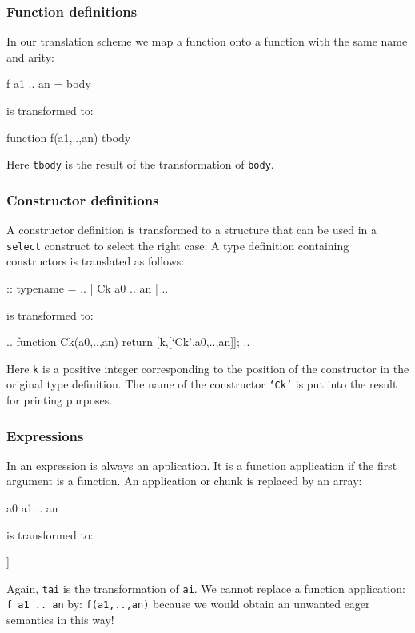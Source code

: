 \subsubsection{Function definitions} 
In our translation scheme we map a \Sapl function onto a \JS function with the same name and arity:
\begin{CleanCode}
f a1 .. an = body
\end{CleanCode}
is transformed to:
\begin{CleanCode}
function f(a1,..,an) { tbody }
\end{CleanCode}
Here \texttt{tbody} is the result of the transformation of \texttt{body}.

\subsubsection{Constructor definitions} 
A constructor definition is transformed to a structure that can be used in a \texttt{select} construct to 
select the right case. A \Sapl type definition containing constructors is translated as follows:
\begin{CleanCode}
:: typename = .. | Ck a0 .. an | ..
\end{CleanCode}
is transformed to:
\begin{CleanCode}
.. function Ck(a0,..,an) {return [k,[`Ck',a0,..,an]];} ..
\end{CleanCode}
Here \texttt{k} is a positive integer corresponding to the position of the constructor in
the original type definition. The name of the constructor \texttt{`Ck'} is put into the result for printing purposes.


\subsubsection{Expressions} 
In \Sapl an expression is always an application. It is a function application if the first argument is a function.
An application or chunk is replaced by an array:
\begin{CleanCode}
a0 a1 .. an 
\end{CleanCode}
is transformed to:
\begin{CleanCode}
[ta0,[ta1,..,tan]]
\end{CleanCode}
Again, \texttt{tai} is the transformation of \texttt{ai}.
We cannot replace a function application: \texttt{f a1 .. an} by: \texttt{f(a1,..,an)} because we would obtain
an unwanted  eager semantics in this way!

